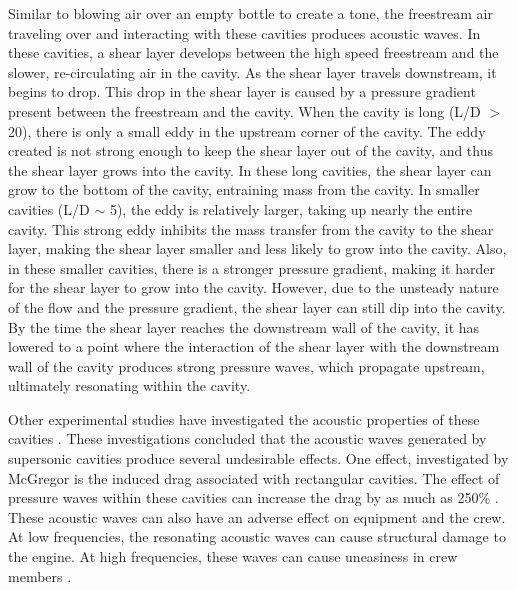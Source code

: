 Similar to blowing air over an empty bottle to create a tone, the freestream air traveling over and interacting with these cavities produces acoustic waves. In these cavities, a shear layer develops between the high speed freestream and the slower, re-circulating air in the cavity. As the shear layer travels downstream, it begins to drop. This drop in the shear layer is caused by a pressure gradient present between the freestream and the cavity. When the cavity is long (L/D $>$ 20), there is only a small eddy in the upstream corner of the cavity. The eddy created is not strong enough to keep the shear layer out of the cavity, and thus the shear layer grows into the cavity. In these long cavities, the shear layer can grow to the bottom of the cavity, entraining mass from the cavity. In smaller cavities (L/D $\sim$ 5), the eddy is relatively larger, taking up nearly the entire cavity. This strong eddy inhibits the mass transfer from the cavity to the shear layer, making the shear layer smaller and less likely to grow into the cavity. Also, in these smaller cavities, there is a stronger pressure gradient, making it harder for the shear layer to grow into the cavity. However, due to the unsteady nature of the flow and the pressure gradient, the shear layer can still dip into the cavity. By the time the shear layer reaches the downstream wall of the cavity, it has lowered to a point where the interaction of the shear layer with the downstream wall of the cavity produces strong pressure waves, which propagate upstream, ultimately resonating within the cavity. 

Other experimental studies have investigated the acoustic properties of these cavities \cite{unalmis2004cavity,heller1996letter,williams2007supersonic, mcgregor1970drag,luo2011drag, sato1999advanced}. These investigations concluded that the acoustic waves generated by supersonic cavities produce several undesirable effects. One effect, investigated by McGregor is the induced drag associated with rectangular cavities. The effect of pressure waves within these cavities can increase the drag by as much as 250\% \cite{mcgregor1970drag}. These acoustic waves can also have an adverse effect on equipment and the crew. At low frequencies, the resonating acoustic waves can cause structural damage to the engine. At high frequencies, these waves can cause uneasiness in crew members \cite{mcgregor1970drag}.

